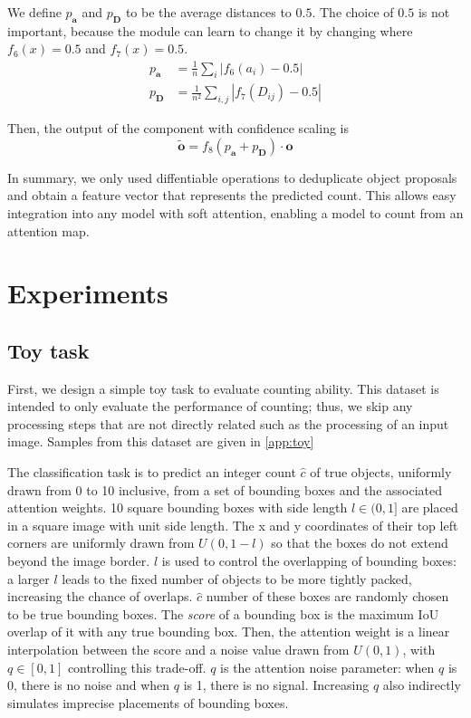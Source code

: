 \documentclass[letterpaper]{article}
\newcommand{\m}[1]{\mathbf{#1}}
\begin{document}
We define $p_{\m a}$ and $p_{\m D}$ to be the average distances to $0.5$.
The choice of $0.5$ is not important, because the module can learn to change it by changing where $f_6(x) = 0.5$ and $f_7(x) = 0.5$.
\begin{align}
    p_{\m a} &= \frac{1}{n} \sum_{i} |f_6(a_{i}) - 0.5|\\
    p_{\m D} &= \frac{1}{n^2} \sum_{i, j} |f_7(D_{ij}) - 0.5|
\end{align}

Then, the output of the component with confidence scaling is
\begin{equation}
    \tilde{\m o} =  f_8(p_{\m a} + p_{\m D}) \cdot \m o
\end{equation}

In summary, we only used diffentiable operations to deduplicate object proposals and obtain a feature vector that represents the predicted count.
This allows easy integration into any model with soft attention, enabling a model to count from an attention map.
 

\section{Experiments}\label{sec:experiments}

\subsection{Toy task}
First, we design a simple toy task to evaluate counting ability.
This dataset is intended to only evaluate the performance of counting; thus, we skip any processing steps that are not directly related such as the processing of an input image.
Samples from this dataset are given in \autoref{app:toy}

The classification task is to predict an integer count $\hat{c}$ of true objects, uniformly drawn from 0 to 10 inclusive, from a set of bounding boxes and the associated attention weights.
10 square bounding boxes with side length $l \in (0, 1]$ are placed in a square image with unit side length.
The x and y coordinates of their top left corners are uniformly drawn from $U(0, 1 - l)$ so that the boxes do not extend beyond the image border.
$l$ is used to control the overlapping of bounding boxes: a larger $l$ leads to the fixed number of objects to be more tightly packed, increasing the chance of overlaps.
$\hat{c}$ number of these boxes are randomly chosen to be true bounding boxes.
The \emph{score} of a bounding box is the maximum IoU overlap of it with any true bounding box.
Then, the attention weight is a linear interpolation between the score and a noise value drawn from $U(0, 1)$, with $q \in [0, 1]$ controlling this trade-off.
$q$ is the attention noise parameter: when $q$ is 0, there is no noise and when $q$ is 1, there is no signal.
Increasing $q$ also indirectly simulates imprecise placements of bounding boxes.
\end{document}
